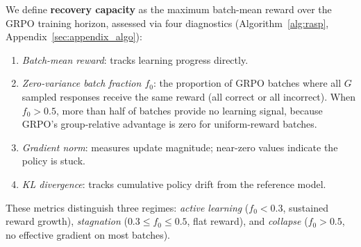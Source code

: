 We define \textbf{recovery capacity} as the maximum batch-mean reward over the GRPO training horizon, assessed via four diagnostics (Algorithm~\ref{alg:rasp}, Appendix~\ref{sec:appendix_algo}):
\begin{enumerate}[nosep,leftmargin=*]
    \item \emph{Batch-mean reward}: tracks learning progress directly.
    \item \emph{Zero-variance batch fraction $f_0$}: the proportion of GRPO batches where all $G$ sampled responses receive the same reward (all correct or all incorrect). When $f_0 > 0.5$, more than half of batches provide no learning signal, because GRPO's group-relative advantage is zero for uniform-reward batches.
    \item \emph{Gradient norm}: measures update magnitude; near-zero values indicate the policy is stuck.
    \item \emph{KL divergence}: tracks cumulative policy drift from the reference model.
\end{enumerate}
These metrics distinguish three regimes: \emph{active learning} ($f_0 < 0.3$, sustained reward growth), \emph{stagnation} ($0.3 \leq f_0 \leq 0.5$, flat reward), and \emph{collapse} ($f_0 > 0.5$, no effective gradient on most batches).
